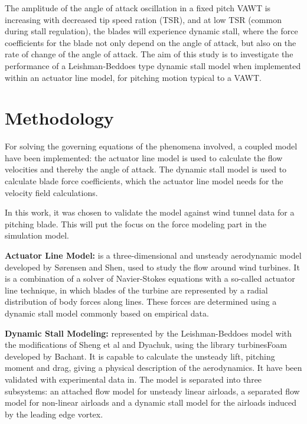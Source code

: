 \documentclass[a4paper]{jpconf}
\begin{document}
The amplitude of the angle of attack oscillation in a fixed pitch VAWT is increasing
with decreased tip speed
ration (TSR), and at low TSR (common during stall regulation), the blades will
experience dynamic stall, where the force coefficients for the blade not only
depend on the angle of attack, but also on the rate of change of the angle of
attack. The aim of this study is to investigate the performance of a
Leishman-Beddoes type dynamic stall model when implemented within an actuator
line model, for pitching motion typical to a VAWT.


\section{Methodology}

For solving the governing equations of the phenomena involved, a coupled model have
been implemented: the actuator line model is used to calculate the flow
velocities and thereby the angle of attack. The dynamic stall model is used to
calculate blade force coefficients, which the actuator line model needs for the
velocity field calculations.

In this work, it was chosen to validate the model
against wind tunnel data for a pitching blade. This will put the focus on the
force modeling part in the simulation model.

\textbf{Actuator Line Model:} is a three-dimensional and unsteady aerodynamic
model developed by S{\o}rensen and Shen\cite{sorensen1999computation}, used to
study the flow around wind turbines. It is a combination of a solver of
Navier-Stokes equations with a so-called actuator line technique, in which
blades of the turbine are represented by a radial distribution of body forces
along lines. These forces are determined using a dynamic stall model commonly
based on empirical data.

\textbf{Dynamic Stall Modeling:} represented by the Leishman-Beddoes
model\cite{leishman1986generalised} with the modifications of Sheng et
al\cite{sheng2008modified} and Dyachuk\cite{dyachuk},
using the library turbinesFoam developed by Bachant\cite{bachant2015simulating}.
It is capable to calculate the unsteady lift,
pitching moment and drag, giving a physical description of the aerodynamics. It
have been validated with experimental data in\cite{leishman1989semi}.
The model is separated into three subsystems: an attached flow model for unsteady linear
airloads, a separated flow model for non-linear airloads and a dynamic stall
model for the airloads induced by the leading edge vortex.
\end{document}
